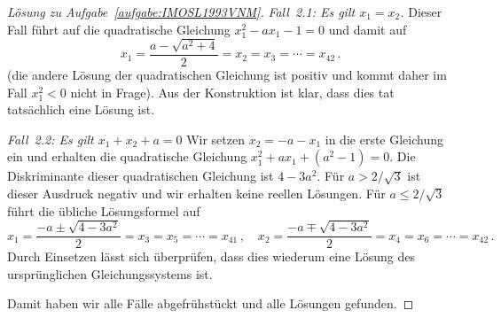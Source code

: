 \begin{proof}[Lösung zu Aufgabe~\ref{aufgabe:IMOSL1993VNM}]
	\emph{Fall~2.1: Es gilt $x_1=x_2$.} Dieser Fall führt auf die quadratische Gleichung $x_1^2-ax_1-1=0$ und damit auf
	\begin{equation*}
		x_1=\frac{a-\sqrt{a^2+4}}2=x_2=x_3=\dotsb=x_{42}\,.
	\end{equation*}
	(die andere Lösung der quadratischen Gleichung ist positiv und kommt daher im Fall $x_1^2<0$ nicht in Frage). Aus der Konstruktion ist klar, dass dies tat tatsächlich eine Lösung ist.
	
	\emph{Fall~2.2: Es gilt $x_1+x_2+a=0$} Wir setzen $x_2=-a-x_1$ in die erste Gleichung ein und erhalten die quadratische Gleichung $x_1^2+ax_1+(a^2-1)=0$. Die Diskriminante dieser quadratischen Gleichung ist $4-3a^2$. Für $a>{2}/{\sqrt{3}}$ ist dieser Ausdruck negativ und wir erhalten keine reellen Lösungen. Für $a\leqslant {2}/{\sqrt{3}}$ führt die übliche Lösungsformel auf 
	\begin{equation*}
		x_1=\frac{-a\pm\sqrt{4-3a^2}}2=x_3=x_5=\dotsb=x_{41}\,,\quad x_2=\frac{-a\mp\sqrt{4-3a^2}}2=x_4=x_6=\dotsb=x_{42}\,.
	\end{equation*}
	Durch Einsetzen lässt sich überprüfen, dass dies wiederum eine Lösung des ursprünglichen Gleichungssystems ist.
	
	Damit haben wir alle Fälle abgefrühstückt und alle Lösungen gefunden.
\end{proof}